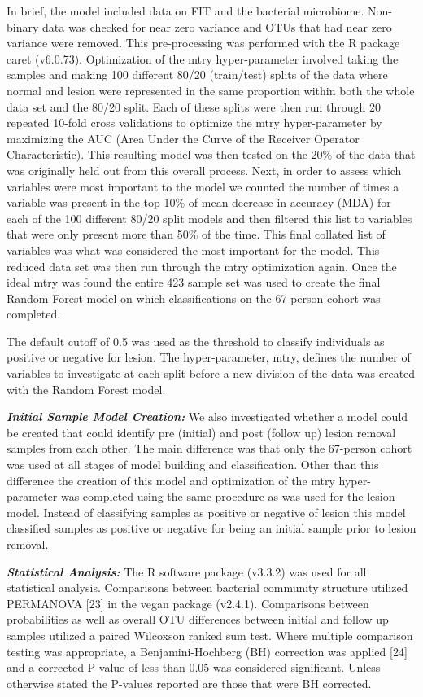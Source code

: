\documentclass[12pt,]{article}
\begin{document}
In brief, the model included data on FIT and the bacterial microbiome.
Non-binary data was checked for near zero variance and OTUs that had
near zero variance were removed. This pre-processing was performed with
the R package caret (v6.0.73). Optimization of the mtry hyper-parameter
involved taking the samples and making 100 different 80/20 (train/test)
splits of the data where normal and lesion were represented in the same
proportion within both the whole data set and the 80/20 split. Each of
these splits were then run through 20 repeated 10-fold cross validations
to optimize the mtry hyper-parameter by maximizing the AUC (Area Under
the Curve of the Receiver Operator Characteristic). This resulting model
was then tested on the 20\% of the data that was originally held out
from this overall process. Next, in order to assess which variables were
most important to the model we counted the number of times a variable
was present in the top 10\% of mean decrease in accuracy (MDA) for each
of the 100 different 80/20 split models and then filtered this list to
variables that were only present more than 50\% of the time. This final
collated list of variables was what was considered the most important
for the model. This reduced data set was then run through the mtry
optimization again. Once the ideal mtry was found the entire 423 sample
set was used to create the final Random Forest model on which
classifications on the 67-person cohort was completed.

The default cutoff of 0.5 was used as the threshold to classify
individuals as positive or negative for lesion. The hyper-parameter,
mtry, defines the number of variables to investigate at each split
before a new division of the data was created with the Random Forest
model.

\textbf{\emph{Initial Sample Model Creation:}} We also investigated
whether a model could be created that could identify pre (initial) and
post (follow up) lesion removal samples from each other. The main
difference was that only the 67-person cohort was used at all stages of
model building and classification. Other than this difference the
creation of this model and optimization of the mtry hyper-parameter was
completed using the same procedure as was used for the lesion model.
Instead of classifying samples as positive or negative of lesion this
model classified samples as positive or negative for being an initial
sample prior to lesion removal.

\textbf{\emph{Statistical Analysis:}} The R software package (v3.3.2)
was used for all statistical analysis. Comparisons between bacterial
community structure utilized PERMANOVA {[}23{]} in the vegan package
(v2.4.1). Comparisons between probabilities as well as overall OTU
differences between initial and follow up samples utilized a paired
Wilcoxson ranked sum test. Where multiple comparison testing was
appropriate, a Benjamini-Hochberg (BH) correction was applied {[}24{]}
and a corrected P-value of less than 0.05 was considered significant.
Unless otherwise stated the P-values reported are those that were BH
corrected.
\end{document}
